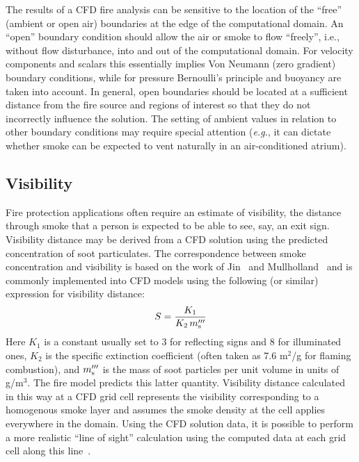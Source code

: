 \documentclass[graybox]{svmult}
\begin{document}
The results of a CFD fire analysis can be sensitive to the location of the ``free'' (ambient or open air) boundaries at the edge of the computational domain. An ``open'' boundary condition should allow the air or smoke to flow ``freely'', i.e., without flow disturbance, into and out of the computational domain. For velocity components and scalars this essentially implies Von Neumann (zero gradient) boundary conditions, while for pressure Bernoulli's principle and buoyancy are taken into account. In general, open boundaries should be located at a sufficient distance from the fire source and regions of interest so that they do not incorrectly influence the solution. The setting of ambient values in relation to other boundary conditions may require special attention ({\em e.g.}, it can dictate whether smoke can be expected to vent naturally in an air-conditioned atrium).



\subsection{Visibility}

Fire protection applications often require an estimate of visibility, the distance through smoke that a person is expected to be able to see, say, an exit sign. Visibility distance may be derived from a CFD solution using the predicted concentration of soot particulates. The correspondence between smoke concentration and visibility is based on the work of Jin~\cite{Jin} and Mullholland~\cite{Mulholland} and is commonly implemented into CFD models using the following (or similar) expression for visibility distance:
\begin{equation}
S = \frac{K_1}{K_2 \, m_{\rm s}'''}
\label{eq:vis}
\end{equation}
Here $K_1$ is a constant usually set to 3 for reflecting signs and 8 for illuminated ones, $K_2$ is the specific extinction coefficient (often taken as 7.6 m$^2$/g for flaming combustion), and $m_{\rm s}'''$ is the mass of soot particles per unit volume in units of g/m$^3$.  The fire model predicts this latter quantity. Visibility distance calculated in this way at a CFD grid cell represents the visibility corresponding to a homogenous smoke layer and assumes the smoke density at the cell applies everywhere in the domain. Using the CFD solution data, it is possible to perform a more realistic ``line of sight'' calculation using the computed data at each grid cell along this line~\cite{Husted}.
\end{document}
